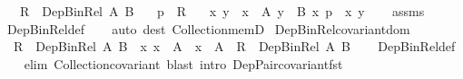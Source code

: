 \begin{isabellebody}
\ \ \ {\isachardoublequoteopen}R\ {\isacharcolon}{\kern0pt}\ Dep{\isacharunderscore}{\kern0pt}Bin{\isacharunderscore}{\kern0pt}Rel\ A\ B{\isachardoublequoteclose}\isanewline
\ \ \ {\isachardoublequoteopen}p\ {\isasymin}\ R{\isachardoublequoteclose}\isanewline
\ \ \ x\ y\ \ {\isachardoublequoteopen}x\ {\isacharcolon}{\kern0pt}\ A{\isachardoublequoteclose}\ {\isachardoublequoteopen}y\ {\isacharcolon}{\kern0pt}\ B\ x{\isachardoublequoteclose}\ {\isachardoublequoteopen}p\ {\isacharequal}{\kern0pt}\ {\isasymlangle}x{\isacharcomma}{\kern0pt}\ y{\isasymrangle}{\isachardoublequoteclose}\isanewline
%
\isadelimproof
\ \ %
\endisadelimproof
%
\isatagproof
{}\isamarkupfalse%
\ assms\ \isamarkupfalse%
\ Dep{\isacharunderscore}{\kern0pt}Bin{\isacharunderscore}{\kern0pt}Rel{\isacharunderscore}{\kern0pt}def\isanewline
\ \ \isamarkupfalse%
\ {\isacharparenleft}{\kern0pt}auto\ dest{\isacharcolon}{\kern0pt}\ Collection{\isacharunderscore}{\kern0pt}memD{\isacharparenright}{\kern0pt}%
\endisatagproof
{\isafoldproof}%
%
\isadelimproof
\isanewline
%
\endisadelimproof
\isanewline
{}\isamarkupfalse%
\ Dep{\isacharunderscore}{\kern0pt}Bin{\isacharunderscore}{\kern0pt}Rel{\isacharunderscore}{\kern0pt}covariant{\isacharunderscore}{\kern0pt}dom{\isacharcolon}{\kern0pt}\isanewline
\ \ {\isachardoublequoteopen}R\ {\isacharcolon}{\kern0pt}\ Dep{\isacharunderscore}{\kern0pt}Bin{\isacharunderscore}{\kern0pt}Rel\ A\ B\ {\isasymLongrightarrow}\ {\isacharparenleft}{\kern0pt}{\isasymAnd}x{\isachardot}{\kern0pt}\ x\ {\isacharcolon}{\kern0pt}\ A\ {\isasymLongrightarrow}\ x\ {\isacharcolon}{\kern0pt}\ A{\isacharprime}{\kern0pt}{\isacharparenright}{\kern0pt}\ {\isasymLongrightarrow}\ R\ {\isacharcolon}{\kern0pt}\ Dep{\isacharunderscore}{\kern0pt}Bin{\isacharunderscore}{\kern0pt}Rel\ A{\isacharprime}{\kern0pt}\ B{\isachardoublequoteclose}\isanewline
%
\isadelimproof
\ \ %
\endisadelimproof
%
\isatagproof
{}\isamarkupfalse%
\ Dep{\isacharunderscore}{\kern0pt}Bin{\isacharunderscore}{\kern0pt}Rel{\isacharunderscore}{\kern0pt}def\isanewline
\ \ \isamarkupfalse%
\ {\isacharparenleft}{\kern0pt}elim\ Collection{\isacharunderscore}{\kern0pt}covariant{\isacharparenright}{\kern0pt}\ {\isacharparenleft}{\kern0pt}blast\ intro{\isacharcolon}{\kern0pt}\ Dep{\isacharunderscore}{\kern0pt}Pair{\isacharunderscore}{\kern0pt}covariant{\isacharunderscore}{\kern0pt}fst{\isacharparenright}{\kern0pt}%
\endisatagproof
{\isafoldproof}%
%
\isadelimproof

\end{isabellebody}

